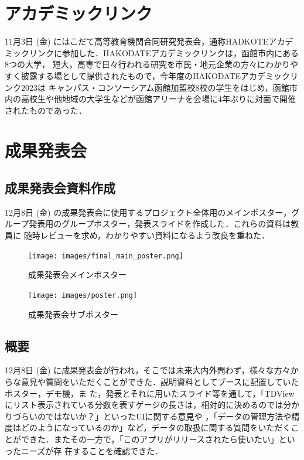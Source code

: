 \section{アカデミックリンク}
11月3日 (金) にはこだて高等教育機関合同研究発表会，通称HADKOTEアカデミックリンクに参加した．HAKODATEアカデミックリンクは，函館市内にある8つの大学，
短大，高専で日々行われる研究を市民・地元企業の方々にわかりやすく披露する場として提供されたもので，今年度のHAKODATEアカデミックリンク2023は
キャンパス・コンソーシアム函館加盟校8校の学生をはじめ，函館市内の高校生や他地域の大学生などが函館アリーナを会場に4年ぶりに対面で開催されたものであった．

\section{成果発表会}
\subsection{成果発表会資料作成}
12月8日 (金) の成果発表会に使用するプロジェクト全体用のメインポスター，グループ発表用のグループポスター，発表スライドを作成した．これらの資料は教員に
随時レビューを求め，わかりやすい資料になるよう改良を重ねた．

\begin{figure}[htbp]
    \centering
    \texttt{[image: images/final\_main\_poster.png]}
    \caption{成果発表会メインポスター}
    \label{fig:final_main_poster}
\end{figure}

\begin{figure}[htbp]
    \centering
    \texttt{[image: images/poster.png]}
    \caption{成果発表会サブポスター}
    \label{fig:poster}
\end{figure}
\pagebreak
{}

\subsection{概要}
12月8日 (金) に成果発表会が行われ，そこでは未来大内外問わず，様々な方々からな意見や質問をいただくことができた．説明資料としてブースに配置していたポスター，デモ機，ま
た，発表とそれに用いたスライド等を通して，「TDViewにリスト表示されている分数を表すゲージの長さは，相対的に決めるのでは分かりづらいのではないか？」といったUIに関する意見や
，「データの管理方法や精度はどのようになっているのか」など，データの取扱に関する質問をいただくことができた．またその一方で，「このアプリがリリースされたら使いたい」といったニーズが存
在することを確認できた．

